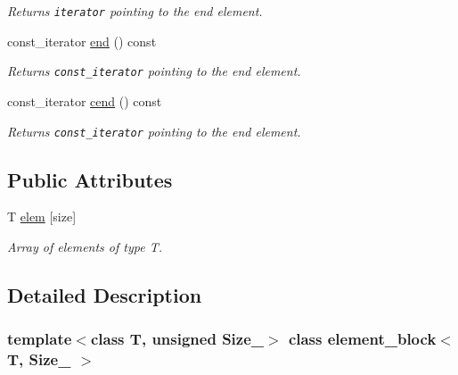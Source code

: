 \begin{CompactItemize}
\begin{CompactList}\small\item\em Returns {\tt iterator} pointing to the end element. \item\end{CompactList}\item 
\hypertarget{group__mnglayer_g75cecec83bf923364d5144e53d10a1ff}{
const\_\-iterator \hyperlink{group__mnglayer_g75cecec83bf923364d5144e53d10a1ff}{end} () const }
\label{group__mnglayer_g75cecec83bf923364d5144e53d10a1ff}

\begin{CompactList}\small\item\em Returns {\tt const\_\-iterator} pointing to the end element. \item\end{CompactList}\item 
\hypertarget{group__mnglayer_g792762a9693c0dcc3ff53d316fa8d9d9}{
const\_\-iterator \hyperlink{group__mnglayer_g792762a9693c0dcc3ff53d316fa8d9d9}{cend} () const }
\label{group__mnglayer_g792762a9693c0dcc3ff53d316fa8d9d9}

\begin{CompactList}\small\item\em Returns {\tt const\_\-iterator} pointing to the end element. \item\end{CompactList}\end{CompactItemize}
\subsection*{Public Attributes}
\begin{CompactItemize}
\item 
\hypertarget{group__mnglayer_g3c39c144c1d556157c908950f62cf168}{
T \hyperlink{group__mnglayer_g3c39c144c1d556157c908950f62cf168}{elem} \mbox{[}size\mbox{]}}
\label{group__mnglayer_g3c39c144c1d556157c908950f62cf168}

\begin{CompactList}\small\item\em Array of elements of type T. \item\end{CompactList}\end{CompactItemize}


\subsection{Detailed Description}
\subsubsection*{template$<$class T, unsigned Size\_\-$>$ class element\_\-block$<$ T, Size\_\- $>$}

